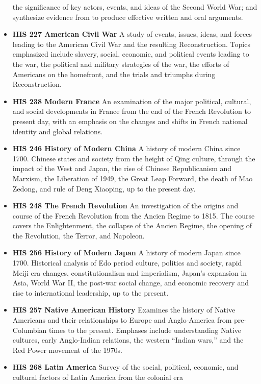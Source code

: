 \documentclass[
  letterpaper,
]{scrbook}
\begin{document}
\begin{itemize}
  the significance of key actors, events, and ideas of the Second World
  War; and synthesize evidence from to produce effective written and
  oral arguments.
\item
  \textbf{HIS 227 American Civil War} A study of events, issues, ideas,
  and forces leading to the American Civil War and the resulting
  Reconstruction. Topics emphasized include slavery, social, economic,
  and political events leading to the war, the political and military
  strategies of the war, the efforts of Americans on the homefront, and
  the trials and triumphs during Reconstruction.
\item
  \textbf{HIS 238 Modern France} An examination of the major political,
  cultural, and social developments in France from the end of the French
  Revolution to present day, with an emphasis on the changes and shifts
  in French national identity and global relations.
\item
  \textbf{HIS 246 History of Modern China} A history of modern China
  since 1700. Chinese states and society from the height of Qing
  culture, through the impact of the West and Japan, the rise of Chinese
  Republicanism and Marxism, the Liberation of 1949, the Great Leap
  Forward, the death of Mao Zedong, and rule of Deng Xiaoping, up to the
  present day.
\item
  \textbf{HIS 248 The French Revolution} An investigation of the origins
  and course of the French Revolution from the Ancien Regime to 1815.
  The course covers the Enlightenment, the collapse of the Ancien
  Regime, the opening of the Revolution, the Terror, and Napoleon.
\item
  \textbf{HIS 256 History of Modern Japan} A history of modern Japan
  since 1700. Historical analysis of Edo period culture, politics and
  society, rapid Meiji era changes, constitutionalism and imperialism,
  Japan's expansion in Asia, World War II, the post-war social change,
  and economic recovery and rise to international leadership, up to the
  present.
\item
  \textbf{HIS 257 Native American History} Examines the history of
  Native Americans and their relationships to Europe and Anglo-America
  from pre- Columbian times to the present. Emphases include
  understanding Native cultures, early Anglo-Indian relations, the
  western ``Indian wars,'' and the Red Power movement of the 1970s.
\item
  \textbf{HIS 268 Latin America} Survey of the social, political,
  economic, and cultural factors of Latin America from the colonial era

\end{itemize}
\end{document}
